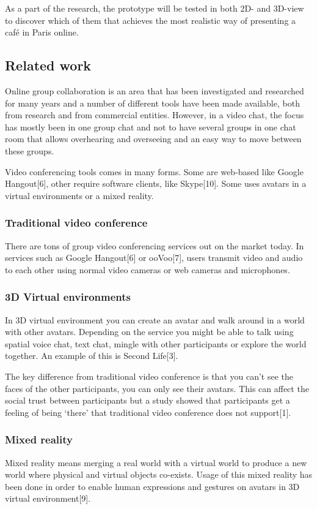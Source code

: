 \documentclass[12pt, titlepage]{article}
\begin{document}
As a part of the research, the prototype will be tested in both 2D- and 3D-view to discover which of them that achieves the most realistic way of presenting a café in Paris online.
\subsection{Related work}
Online group collaboration is an area that has been investigated and researched for many years and a number of different tools have been made available, both from research and from commercial entities. However, in a video chat, the focus has mostly been in one group chat and not to have several groups in one chat room that allows overhearing and overseeing and an easy way to move between these groups.

Video conferencing tools comes in many forms. Some are web-based like Google Hangout[6], other require software clients, like Skype[10]. Some uses avatars in a virtual environments or a mixed reality.
\subsubsection{Traditional video conference}
There are tons of group video conferencing services out on the market today. In services such as Google Hangout[6] or ooVoo[7], users transmit video and audio to each other using normal video cameras or web cameras and microphones.
\subsubsection{3D Virtual environments}
In 3D virtual environment you can create an avatar and walk around in a world with other avatars. Depending on the service you might be able to talk using spatial voice chat, text chat, mingle with other participants or explore the world together. An example of this is Second Life[3].

The key difference from traditional video conference is that you can’t see the faces of the other participants, you can only see their avatars. This can affect the social trust between participants but a study showed that participants get a feeling of being ‘there’ that traditional video conference does not support[1].
\subsubsection{Mixed reality}
Mixed reality means merging a real world with a virtual world to produce a new world where physical and virtual objects co-exists. Usage of this mixed reality has been done in order to enable human expressions and gestures on avatars in 3D virtual environment[9].
\end{document}
